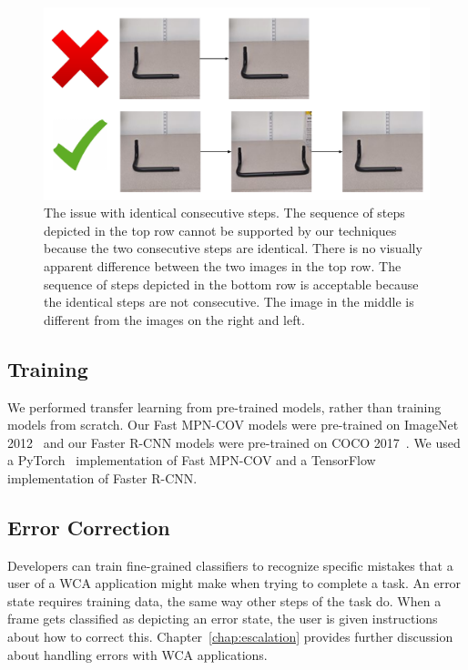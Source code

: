 \begin{figure}
  \includegraphics[width=\columnwidth]{figures/consec_step.pdf}
  \caption[The issue with identical consecutive steps]{
    The issue with identical consecutive steps.
    The sequence of steps depicted in the top row cannot be supported by our
    techniques because the two consecutive steps are identical.
    There is no visually apparent difference between the two images in the top
    row.
    The sequence of steps depicted in the bottom row is acceptable because the
    identical steps are not consecutive.
    The image in the middle is different from the images on the right and left.
  }\label{fig:consec_step}
\end{figure}

\subsection{Training}

We performed transfer learning from pre-trained models, rather than training
models from scratch.
Our Fast MPN-COV models were pre-trained on ImageNet 2012~\cite{ILSVRC15} and
our Faster R-CNN models were pre-trained on COCO 2017~\cite{coco}.
We used a PyTorch~\cite{pytorch} implementation of Fast MPN-COV and a
TensorFlow~\cite{tensorflow2015-whitepaper} implementation of Faster R-CNN.

\subsection{Error Correction}

Developers can train fine-grained classifiers to recognize specific mistakes
that a user of a WCA application might make when trying to complete a task.
An error state requires training data, the same way other steps of the task do.
When a frame gets classified as depicting an error state, the user is given
instructions about how to correct this.
Chapter~\ref{chap:escalation} provides further discussion about handling errors
with WCA applications.

